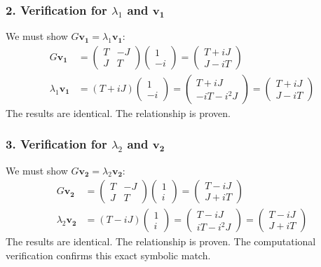 \subsubsection*{2. Verification for $\lambda_1$ and $\mathbf{v_1}$}
We must show $G\mathbf{v_1} = \lambda_1\mathbf{v_1}$:
\begin{align*}
    G\mathbf{v_1} &= \begin{pmatrix} T & -J \\ J & T \end{pmatrix} \begin{pmatrix} 1 \\ -i \end{pmatrix} = \begin{pmatrix} T + iJ \\ J - iT \end{pmatrix} \\
    \lambda_1\mathbf{v_1} &= (T+iJ) \begin{pmatrix} 1 \\ -i \end{pmatrix} = \begin{pmatrix} T + iJ \\ -iT - i^2J \end{pmatrix} = \begin{pmatrix} T + iJ \\ J - iT \end{pmatrix}
\end{align*}
The results are identical. The relationship is proven.

\subsubsection*{3. Verification for $\lambda_2$ and $\mathbf{v_2}$}
We must show $G\mathbf{v_2} = \lambda_2\mathbf{v_2}$:
\begin{align*}
    G\mathbf{v_2} &= \begin{pmatrix} T & -J \\ J & T \end{pmatrix} \begin{pmatrix} 1 \\ i \end{pmatrix} = \begin{pmatrix} T - iJ \\ J + iT \end{pmatrix} \\
    \lambda_2\mathbf{v_2} &= (T-iJ) \begin{pmatrix} 1 \\ i \end{pmatrix} = \begin{pmatrix} T - iJ \\ iT - i^2J \end{pmatrix} = \begin{pmatrix} T - iJ \\ J + iT \end{pmatrix}
\end{align*}
The results are identical. The relationship is proven. The computational verification confirms this exact symbolic match.

